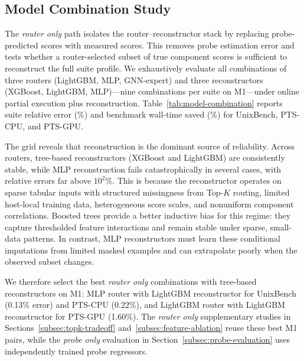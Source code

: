 \documentclass[sigconf, review, anonymous, balance=false]{acmart}
\newcommand{\ptscpu}{PTS-CPU}
\newcommand{\ptsgpu}{PTS-GPU}
\begin{document}
\subsection{Model Combination Study}
\label{subsec:model-combination}
The \emph{router only} path isolates the router--reconstructor stack by replacing probe-predicted scores with measured scores.
This removes probe estimation error and tests whether a router-selected subset of true component scores is sufficient to reconstruct the full suite profile.
We exhaustively evaluate all combinations of three routers (LightGBM, MLP, GNN-expert) and three reconstructors (XGBoost, LightGBM, MLP)---nine combinations per suite on M1---under online partial execution plus reconstruction.
Table~\ref{tab:model-combination} reports suite relative error (\%) and benchmark wall-time saved (\%) for UnixBench, \ptscpu{}, and \ptsgpu{}.

The grid reveals that reconstruction is the dominant source of reliability.
Across routers, tree-based reconstructors (XGBoost and LightGBM) are consistently stable, while MLP reconstruction fails catastrophically in several cases, with relative errors far above \(10^{2}\%\).
This is because the reconstructor operates on sparse tabular inputs with structured missingness from Top-\(K\) routing, limited host-local training data, heterogeneous score scales, and nonuniform component correlations.
Boosted trees provide a better inductive bias for this regime: they capture thresholded feature interactions and remain stable under sparse, small-data patterns.
In contrast, MLP reconstructors must learn these conditional imputations from limited masked examples and can extrapolate poorly when the observed subset changes.

We therefore select the best \emph{router only} combinations with tree-based reconstructors on M1: MLP router with LightGBM reconstructor for UnixBench (0.13\% error) and \ptscpu{} (0.22\%), and LightGBM router with LightGBM reconstructor for \ptsgpu{} (1.60\%).
The \emph{router only} supplementary studies in Sections~\ref{subsec:topk-tradeoff} and~\ref{subsec:feature-ablation} reuse these best M1 pairs, while the \emph{probe only} evaluation in Section~\ref{subsec:probe-evaluation} uses independently trained probe regressors.
\end{document}
